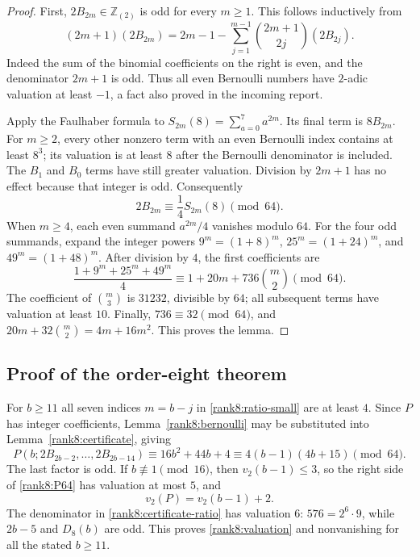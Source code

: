 \begin{proof}
First, $2B_{2m}\in\mathbb Z_{(2)}$ is odd for every $m\ge1$.
This follows inductively from
\[
 (2m+1)(2B_{2m})
 =2m-1-\sum_{j=1}^{m-1}\binom{2m+1}{2j}(2B_{2j}).
\]
Indeed the sum of the binomial coefficients on the right is even,
and the denominator $2m+1$ is odd.  Thus all even Bernoulli
numbers have $2$-adic valuation at least $-1$, a fact also proved
in the incoming report.

Apply the Faulhaber formula to
$S_{2m}(8)=\sum_{a=0}^{7}a^{2m}$.  Its final term is $8B_{2m}$.
For $m\ge2$, every other nonzero term with an even Bernoulli index
contains at least $8^3$; its valuation is at least $8$ after the
Bernoulli denominator is included.  The $B_1$ and $B_0$ terms have
still greater valuation.  Division by $2m+1$ has no effect because
that integer is odd.  Consequently
\[
 2B_{2m}\equiv\frac14S_{2m}(8)\pmod {64}.
\]
When $m\ge4$, each even summand $a^{2m}/4$ vanishes modulo $64$.
For the four odd summands, expand the integer powers
$9^m=(1+8)^m$, $25^m=(1+24)^m$, and $49^m=(1+48)^m$.
After division by $4$, the first coefficients are
\[
 \frac{1+9^m+25^m+49^m}{4}
 \equiv1+20m+736\binom m2\pmod {64}.
\]
The coefficient of $\binom m3$ is $31232$, divisible by $64$;
all subsequent terms have valuation at least $10$.  Finally,
$736\equiv32\pmod {64}$, and
$20m+32\binom m2=4m+16m^2$.  This proves the lemma.
\end{proof}

\subsection{Proof of the order-eight theorem}

For $b\ge11$ all seven indices $m=b-j$ in
\eqref{rank8:ratio-small} are at least $4$.  Since $P$ has integer
coefficients, Lemma~\ref{rank8:bernoulli} may be substituted into
Lemma~\ref{rank8:certificate}, giving
\begin{equation}\label{rank8:P64}
 P(b;2B_{2b-2},\ldots,2B_{2b-14})
 \equiv16b^2+44b+4
 \equiv4(b-1)(4b+15)\pmod {64}.
\end{equation}
The last factor is odd.  If $b\not\equiv1\pmod {16}$, then
$v_2(b-1)\le3$, so the right side of \eqref{rank8:P64} has valuation
at most $5$, and
\[
 v_2(P)=v_2(b-1)+2.
\]
The denominator in \eqref{rank8:certificate-ratio} has valuation
$6$: $576=2^6\cdot9$, while $2b-5$ and $D_8(b)$ are odd.
This proves \eqref{rank8:valuation} and nonvanishing for all the
stated $b\ge11$.


